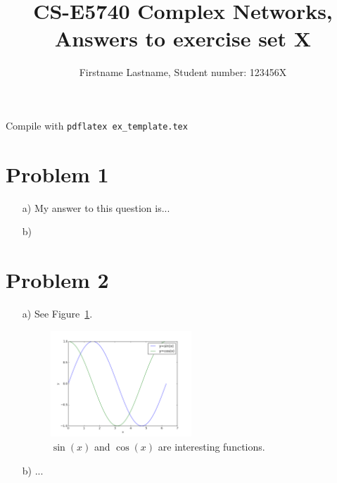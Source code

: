 \documentclass[a4paper,12pt]{article}
\author{Firstname Lastname, Student number: 123456X}
\title{
CS-E5740 Complex Networks, \\
Answers to exercise set X
}
\begin{document}
\vspace{8pt}

\maketitle

Compile with \verb!pdflatex ex_template.tex!

\section*{Problem 1}

\begin{itemize}
\item[a)] My answer to this question is...
\item[b)]
\end{itemize}





\clearpage

\section*{Problem 2}

\begin{itemize}

\item[a)] See Figure~\ref{fig:myfirstfig}.
\begin{figure}[h!]
\begin{center}
\includegraphics[width=0.5\textwidth]{example.png}
\caption{$\sin(x)$ and $\cos(x)$ are interesting functions.}
\label{fig:myfirstfig}
\end{center}
\end{figure}

\item[b)] ...

\end{itemize}

\clearpage
\end{document}
